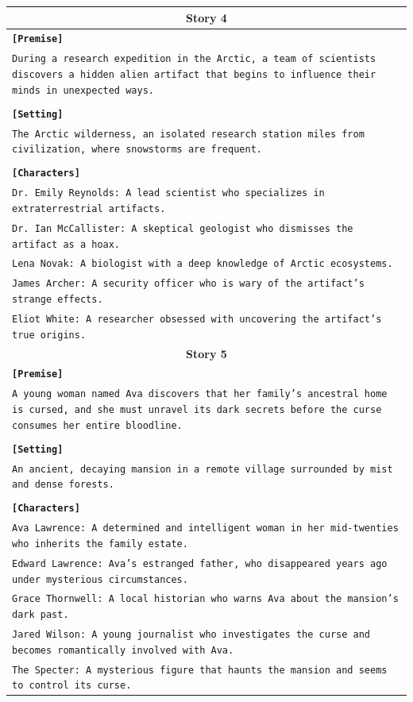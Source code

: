 \documentclass[letterpaper]{article} %
\begin{document}
\begin{small}
\begin{longtable}{p{\textwidth}}
    \multicolumn{1}{c}{\textbf{Story 4}} \\
    \midrule
    \texttt{\textbf{[Premise]}} \\
    \texttt{During a research expedition in the Arctic, a team of scientists discovers a hidden alien artifact that begins to influence their minds in unexpected ways.} \\\\
    \texttt{\textbf{[Setting]}} \\
    \texttt{The Arctic wilderness, an isolated research station miles from civilization, where snowstorms are frequent.} \\\\
    \texttt{\textbf{[Characters]}} \\
    \texttt{Dr. Emily Reynolds: A lead scientist who specializes in extraterrestrial artifacts.} \\
    \texttt{Dr. Ian McCallister: A skeptical geologist who dismisses the artifact as a hoax.} \\
    \texttt{Lena Novak: A biologist with a deep knowledge of Arctic ecosystems.} \\
    \texttt{James Archer: A security officer who is wary of the artifact's strange effects.} \\
    \texttt{Eliot White: A researcher obsessed with uncovering the artifact's true origins.} \\
    \midrule
  
    \multicolumn{1}{c}{\textbf{Story 5}} \\
    \midrule
    \texttt{\textbf{[Premise]}} \\
    \texttt{A young woman named Ava discovers that her family's ancestral home is cursed, and she must unravel its dark secrets before the curse consumes her entire bloodline.} \\\\
    \texttt{\textbf{[Setting]}} \\
    \texttt{An ancient, decaying mansion in a remote village surrounded by mist and dense forests.} \\\\
    \texttt{\textbf{[Characters]}} \\
    \texttt{Ava Lawrence: A determined and intelligent woman in her mid-twenties who inherits the family estate.} \\
    \texttt{Edward Lawrence: Ava's estranged father, who disappeared years ago under mysterious circumstances.} \\
    \texttt{Grace Thornwell: A local historian who warns Ava about the mansion's dark past.} \\
    \texttt{Jared Wilson: A young journalist who investigates the curse and becomes romantically involved with Ava.} \\
    \texttt{The Specter: A mysterious figure that haunts the mansion and seems to control its curse.} \\
    \midrule
  

\end{longtable}
\end{small}
\end{document}
